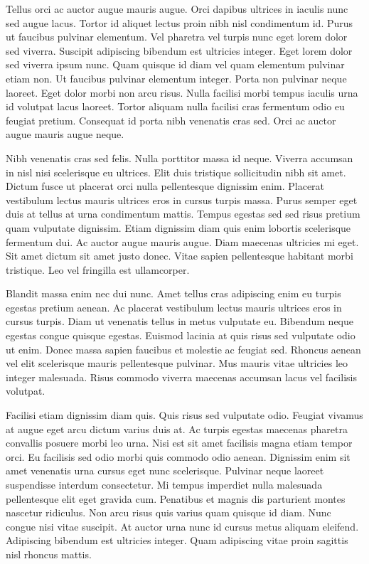 \documentclass[11pt,a4paper]{article}
\begin{document}
Tellus orci ac auctor augue mauris augue. Orci dapibus ultrices in iaculis nunc sed augue lacus. Tortor id aliquet lectus proin nibh nisl condimentum id. Purus ut faucibus pulvinar elementum. Vel pharetra vel turpis nunc eget lorem dolor sed viverra. Suscipit adipiscing bibendum est ultricies integer. Eget lorem dolor sed viverra ipsum nunc. Quam quisque id diam vel quam elementum pulvinar etiam non. Ut faucibus pulvinar elementum integer. Porta non pulvinar neque laoreet. Eget dolor morbi non arcu risus. Nulla facilisi morbi tempus iaculis urna id volutpat lacus laoreet. Tortor aliquam nulla facilisi cras fermentum odio eu feugiat pretium. Consequat id porta nibh venenatis cras sed. Orci ac auctor augue mauris augue neque.

Nibh venenatis cras sed felis. Nulla porttitor massa id neque. Viverra accumsan in nisl nisi scelerisque eu ultrices. Elit duis tristique sollicitudin nibh sit amet. Dictum fusce ut placerat orci nulla pellentesque dignissim enim. Placerat vestibulum lectus mauris ultrices eros in cursus turpis massa. Purus semper eget duis at tellus at urna condimentum mattis. Tempus egestas sed sed risus pretium quam vulputate dignissim. Etiam dignissim diam quis enim lobortis scelerisque fermentum dui. Ac auctor augue mauris augue. Diam maecenas ultricies mi eget. Sit amet dictum sit amet justo donec. Vitae sapien pellentesque habitant morbi tristique. Leo vel fringilla est ullamcorper.

Blandit massa enim nec dui nunc. Amet tellus cras adipiscing enim eu turpis egestas pretium aenean. Ac placerat vestibulum lectus mauris ultrices eros in cursus turpis. Diam ut venenatis tellus in metus vulputate eu. Bibendum neque egestas congue quisque egestas. Euismod lacinia at quis risus sed vulputate odio ut enim. Donec massa sapien faucibus et molestie ac feugiat sed. Rhoncus aenean vel elit scelerisque mauris pellentesque pulvinar. Mus mauris vitae ultricies leo integer malesuada. Risus commodo viverra maecenas accumsan lacus vel facilisis volutpat.

Facilisi etiam dignissim diam quis. Quis risus sed vulputate odio. Feugiat vivamus at augue eget arcu dictum varius duis at. Ac turpis egestas maecenas pharetra convallis posuere morbi leo urna. Nisi est sit amet facilisis magna etiam tempor orci. Eu facilisis sed odio morbi quis commodo odio aenean. Dignissim enim sit amet venenatis urna cursus eget nunc scelerisque. Pulvinar neque laoreet suspendisse interdum consectetur. Mi tempus imperdiet nulla malesuada pellentesque elit eget gravida cum. Penatibus et magnis dis parturient montes nascetur ridiculus. Non arcu risus quis varius quam quisque id diam. Nunc congue nisi vitae suscipit. At auctor urna nunc id cursus metus aliquam eleifend. Adipiscing bibendum est ultricies integer. Quam adipiscing vitae proin sagittis nisl rhoncus mattis.
\end{document}
